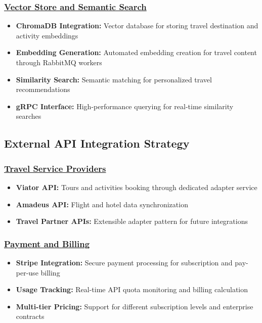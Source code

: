 \subsubsection*{\underline{Vector Store and Semantic Search}}
\begin{itemize}
    \item \textbf{ChromaDB Integration:} Vector database for storing travel destination and activity embeddings
    \item \textbf{Embedding Generation:} Automated embedding creation for travel content through RabbitMQ workers
    \item \textbf{Similarity Search:} Semantic matching for personalized travel recommendations
    \item \textbf{gRPC Interface:} High-performance querying for real-time similarity searches
\end{itemize}

\subsection{External API Integration Strategy}

\subsubsection*{\underline{Travel Service Providers}}
\begin{itemize}
    \item \textbf{Viator API:} Tours and activities booking through dedicated adapter service
    \item \textbf{Amadeus API:} Flight and hotel data synchronization
    \item \textbf{Travel Partner APIs:} Extensible adapter pattern for future integrations
\end{itemize}

\subsubsection*{\underline{Payment and Billing}}
\begin{itemize}
    \item \textbf{Stripe Integration:} Secure payment processing for subscription and pay-per-use billing
    \item \textbf{Usage Tracking:} Real-time API quota monitoring and billing calculation
    \item \textbf{Multi-tier Pricing:} Support for different subscription levels and enterprise contracts
\end{itemize}

